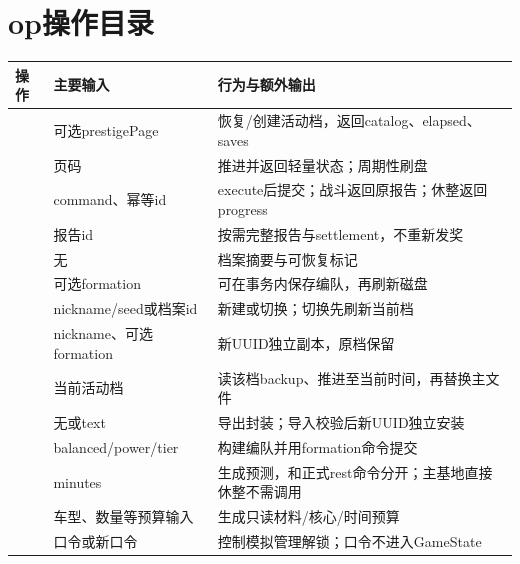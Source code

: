\section{op操作目录}
\begin{small}\begin{longtable}{@{}P{33mm}P{45mm}P{66mm}@{}}
\toprule 操作 & 主要输入 & 行为与额外输出\\\midrule\endhead
{} & 可选prestigePage & 恢复/创建活动档，返回catalog、elapsed、saves\\
 & 页码 & 推进并返回轻量状态；周期性刷盘\\
 & command、幂等id & execute后提交；战斗返回原报告；休整返回progress\\
 & 报告id & 按需完整报告与settlement，不重新发奖\\
 & 无 & 档案摘要与可恢复标记\\
 & 可选formation & 可在事务内保存编队，再刷新磁盘\\
 & nickname/seed或档案id & 新建或切换；切换先刷新当前档\\
 & nickname、可选formation & 新UUID独立副本，原档保留\\
 & 当前活动档 & 读该档backup、推进至当前时间，再替换主文件\\
 & 无或text & 导出封装；导入校验后新UUID独立安装\\
 & balanced/power/tier & 构建编队并用formation命令提交\\
 & minutes & 生成预测，和正式rest命令分开；主基地直接休整不需调用\\
 & 车型、数量等预算输入 & 生成只读材料/核心/时间预算\\
 & 口令或新口令 & 控制模拟管理解锁；口令不进入GameState\\
\bottomrule\end{longtable}\end{small}

